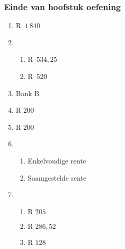{\begin{multicols}{3}
\subsubsection*{Einde van hoofstuk oefening} %

    \begin{enumerate}[label=\textbf{\arabic*}.]
	\item R~$1~840$%

	\item %
	\begin{enumerate}[noitemsep, label=\textbf{(\alph*)} ]
	    \item R~$534,25$%
	    \item R~$520$%
	\end{enumerate}

	\item Bank B%

	\item R $200$ %

	\item R $200$ %

	\item %
	\begin{enumerate}[noitemsep, label=\textbf{(\alph*)} ]
	    \item Enkelvoudige rente%

	    \item Saamgestelde rente%
	\end{enumerate}

	\item %
	\begin{enumerate}[noitemsep, label=\textbf{(\alph*)} ]
	\item $\mbox{R }205$
	\item $\mbox{R }286,52$
	\item $\mbox{R }128$
	\end{enumerate}


\end{enumerate}
\end{multicols}}
